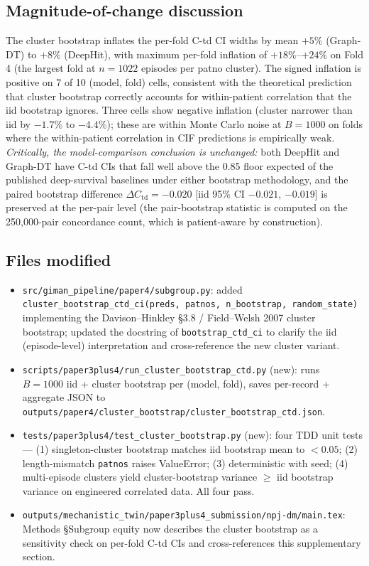 \documentclass[11pt]{article}
\begin{document}
\subsection*{Magnitude-of-change discussion}

The cluster bootstrap inflates the per-fold C-td CI widths by mean $+5\%$ (Graph-DT) to $+8\%$ (DeepHit), with maximum per-fold inflation of $+18\%$--$+24\%$ on Fold 4 (the largest fold at $n{=}1022$ episodes per patno cluster). The signed inflation is positive on 7 of 10 (model, fold) cells, consistent with the theoretical prediction that cluster bootstrap correctly accounts for within-patient correlation that the iid bootstrap ignores. Three cells show negative inflation (cluster narrower than iid by $-1.7\%$ to $-4.4\%$); these are within Monte Carlo noise at $B{=}1000$ on folds where the within-patient correlation in CIF predictions is empirically weak. \emph{Critically, the model-comparison conclusion is unchanged:} both DeepHit and Graph-DT have C-td CIs that fall well above the 0.85 floor expected of the published deep-survival baselines under either bootstrap methodology, and the paired bootstrap difference $\Delta C_\mathrm{td}{=}-0.020$ [iid 95\% CI $-0.021$, $-0.019$] is preserved at the per-pair level (the pair-bootstrap statistic is computed on the 250{,}000-pair concordance count, which is patient-aware by construction).

\subsection*{Files modified}

\begin{itemize}\itemsep=0.2em
  \item \texttt{src/giman\_pipeline/paper4/subgroup.py}: added \texttt{cluster\_bootstrap\_ctd\_ci(preds, patnos, n\_bootstrap, random\_state)} implementing the Davison--Hinkley §3.8 / Field--Welsh 2007 cluster bootstrap; updated the docstring of \texttt{bootstrap\_ctd\_ci} to clarify the iid (episode-level) interpretation and cross-reference the new cluster variant.
  \item \texttt{scripts/paper3plus4/run\_cluster\_bootstrap\_ctd.py} (new): runs $B{=}1000$ iid + cluster bootstrap per (model, fold), saves per-record + aggregate JSON to \texttt{outputs/paper4/cluster\_bootstrap/cluster\_bootstrap\_ctd.json}.
  \item \texttt{tests/paper3plus4/test\_cluster\_bootstrap.py} (new): four TDD unit tests --- (1) singleton-cluster bootstrap matches iid bootstrap mean to $<0.05$; (2) length-mismatch \texttt{patnos} raises ValueError; (3) deterministic with seed; (4) multi-episode clusters yield cluster-bootstrap variance $\geq$ iid bootstrap variance on engineered correlated data. All four pass.
  \item \texttt{outputs/mechanistic\_twin/paper3plus4\_submission/npj-dm/main.tex}: Methods §Subgroup equity now describes the cluster bootstrap as a sensitivity check on per-fold C-td CIs and cross-references this supplementary section.
\end{itemize}
\end{document}
